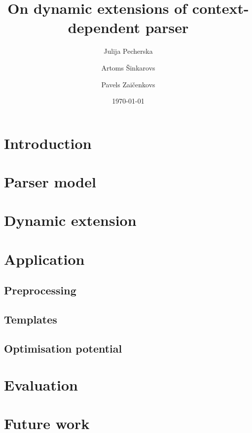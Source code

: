\documentclass{article}
\author{Julija Pecherska \and Artoms \v{S}inkarovs \and Pavels Zai\v{c}enkovs}
\title{On dynamic extensions of context-dependent parser}
\date{\today}
\begin{document}
\maketitle

\begin{abstract}
\end{abstract}

\section{Introduction}


\section{Parser model}

\section{Dynamic extension}

\section{Application}
\subsection{Preprocessing}
\subsection{Templates}
\subsection{Optimisation potential}

\section{Evaluation}

\section{Future work}
\end{document}
